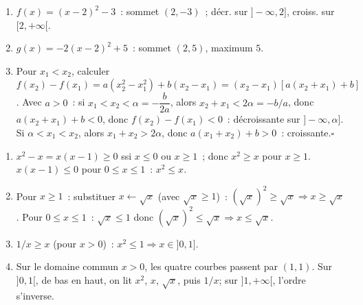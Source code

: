 \begin{enumerate}
  \item $f(x)=(x-2)^2-3$~: sommet $(2,-3)$~; d\'ecr. sur $]-\infty,2]$, croiss. sur $[2,+\infty[$.
  \item $g(x)=-2(x-2)^2+5$~: sommet $(2,5)$, maximum $5$.
  \item Pour $x_1<x_2$, calculer $f(x_2)-f(x_1)=a(x_2^2-x_1^2)+b(x_2-x_1)=(x_2-x_1)[a(x_2+x_1)+b]$.
        Avec $a>0$~: si $x_1<x_2<\alpha=-\dfrac{b}{2a}$, alors $x_2+x_1<2\alpha=-b/a$, donc $a(x_2+x_1)+b<0$,
        donc $f(x_2)-f(x_1)<0$~: d\'ecroissante sur $]-\infty,\alpha]$.
        Si $\alpha<x_1<x_2$, alors $x_1+x_2>2\alpha$, donc $a(x_1+x_2)+b>0$~: croissante.\hfill$\square$
\end{enumerate}


\begin{enumerate}
  \item $x^2-x=x(x-1)\geq0$ ssi $x\leq0$ ou $x\geq1$~; donc $x^2\geq x$ pour $x\geq1$.\checkmark
        $x(x-1)\leq0$ pour $0\leq x\leq1$~: $x^2\leq x$.\checkmark
  \item Pour $x\geq1$~: substituer $x\leftarrow\sqrt{x}$ (avec $\sqrt{x}\geq1$)~:
        $(\sqrt{x})^2\geq\sqrt{x}\Rightarrow x\geq\sqrt{x}$.\checkmark
        Pour $0\leq x\leq1$~: $\sqrt{x}\leq1$ donc $(\sqrt{x})^2\leq\sqrt{x}\Rightarrow x\leq\sqrt{x}$.\checkmark
  \item $1/x\geq x$ (pour $x>0$)~: $x^2\leq1\Rightarrow x\in]0,1]$.
  \item Sur le domaine commun $x>0$, les quatre courbes passent par $(1,1)$.
        Sur $]0,1[$, de bas en haut, on lit $x^2$, $x$, $\sqrt{x}$,
        puis $1/x$; sur $]1,+\infty[$, l'ordre s'inverse.
        \begin{center}
        \end{center}
\end{enumerate}

